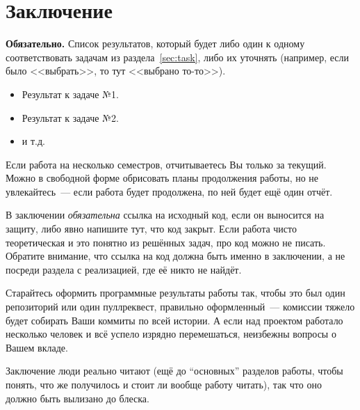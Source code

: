 
\section*{Заключение}
\textbf{Обязательно.} Список результатов, который будет либо один к одному соответствовать задачам из раздела~\ref{sec:task}, либо их уточнять (например, если было <<выбрать>>, то тут <<выбрано то-то>>).

\begin{itemize}
    \item Результат к задаче №1.
    \item Результат к задаче №2.
    \item и т.д.
\end{itemize}
\noindent Если работа на несколько семестров, отчитываетесь Вы только за текущий. Можно в свободной форме обрисовать планы продолжения работы, но не увлекайтесь~--- если работа будет продолжена, по ней будет ещё один отчёт.

В заключении \emph{обязательна} ссылка на исходный код, если он выносится на защиту, либо явно напишите тут, что код закрыт. Если работа чисто теоретическая и это понятно из решённых задач, про код можно не писать. Обратите внимание, что ссылка на код должна быть именно в заключении, а не посреди раздела с реализацией, где её никто не найдёт.

Старайтесь оформить программные результаты работы так, чтобы это был один репозиторий или один пуллреквест, правильно оформленный~--- комиссии тяжело будет собирать Ваши коммиты по всей истории. А если над проектом работало несколько человек и всё успело изрядно перемешаться, неизбежны вопросы о Вашем вкладе.

Заключение люди реально читают (ещё до \enquote{основных} разделов работы, чтобы понять, что же получилось и стоит ли вообще работу читать), так что оно должно быть вылизано до блеска.

